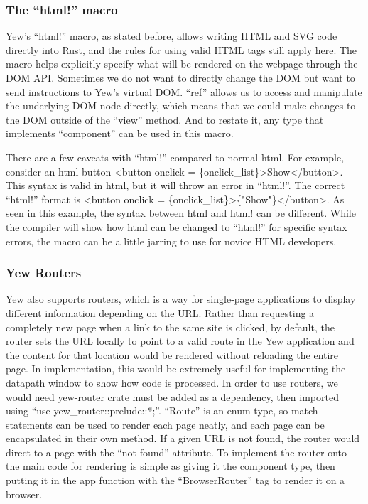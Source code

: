\documentclass[parskip=half, fontsize=12pt]{scrartcl}
\begin{document}
\subsubsection{The ``html!'' macro}
\label{subsec:html-macro}

Yew's ``html!'' macro, as stated before, allows writing HTML and SVG
code directly into Rust, and the rules for using valid HTML tags still
apply here. The macro helps explicitly specify what will be rendered on
the webpage through the DOM API. Sometimes we do not want to directly
change the DOM but want to send instructions to Yew's virtual DOM.
``ref'' allows us to access and manipulate the underlying DOM node
directly, which means that we could make changes to the DOM outside of
the ``view'' method. And to restate it, any type that implements
``component'' can be used in this macro.

There are a few caveats with ``html!'' compared to normal html. For
example, consider an html button \textless button onclick =
\{onclick\_list\}\textgreater Show\textless/button\textgreater. This
syntax is valid in html, but it will throw an error in ``html!''. The
correct ``html!'' format is \textless button onclick =
\{onclick\_list\}\textgreater\{"Show"\}\textless/button\textgreater. As
seen in this example, the syntax between html and html! can be
different. While the compiler will show how html can be changed to
``html!'' for specific syntax errors, the macro can be a little jarring
to use for novice HTML developers.

\subsubsection{Yew Routers}

Yew also supports routers, which is a way for single-page applications
to display different information depending on the URL. Rather than
requesting a completely new page when a link to the same site is
clicked, by default, the router sets the URL locally to point to a valid
route in the Yew application and the content for that location would be
rendered without reloading the entire page. In implementation, this
would be extremely useful for implementing the datapath window to show
how code is processed. In order to use routers, we would need yew-router
crate must be added as a dependency, then imported using ``use
yew\_router::prelude::*;''. ``Route'' is an enum type, so match
statements can be used to render each page neatly, and each page can be
encapsulated in their own method. If a given URL is not found, the
router would direct to a page with the ``not found'' attribute. To
implement the router onto the main code for rendering is simple as
giving it the component type, then putting it in the app function with
the ``BrowserRouter'' tag to render it on a browser.
\end{document}
